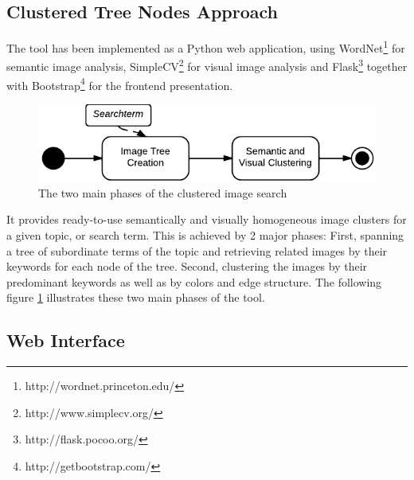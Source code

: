 \subsection{Clustered Tree Nodes Approach}
The tool has been implemented as a Python web application, using WordNet\footnote{http://wordnet.princeton.edu/} for semantic image analysis, SimpleCV\footnote{http://www.simplecv.org/} for visual image analysis and Flask\footnote{http://flask.pocoo.org/} together with Bootstrap\footnote{http://getbootstrap.com/} for the frontend presentation. \\
\begin{figure}[h]
\centering
\includegraphics[]{images/search_process_highlevel.pdf}
\caption{The two main phases of the clustered image search}
\label{fig_overallprocess}
\end{figure}
It provides ready-to-use semantically and visually homogeneous image clusters for a given topic, or search term. This is achieved by 2 major phases: First, spanning a tree of subordinate terms of the topic and retrieving related images by their keywords for each node of the tree. Second, clustering the images by their predominant keywords as well as by colors and edge structure. The following figure \ref{fig_overallprocess} illustrates these two main phases of the tool.

\subsection{Web Interface}


